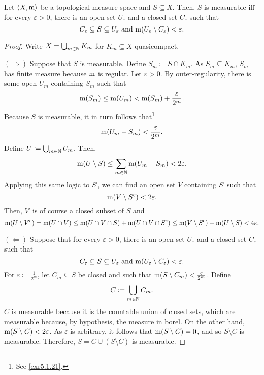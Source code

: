 \begin{prp}\label{prp5.1.39}
Let $\langle X,\mathrm{m}\rangle$ be a topological measure space and $S\subseteq X$.  Then, $S$ is measurable iff for every $\varepsilon >0$, there is an open set $U_{\varepsilon}$ and a closed set $C_{\varepsilon}$ such that
\begin{equation}
C_{\varepsilon}\subseteq S\subseteq U_{\varepsilon}\text{ and }\mathrm{m} (U_{\varepsilon}\setminus C_{\varepsilon})<\varepsilon .
\end{equation}
\begin{proof}
Write $X=\bigcup _{m\in \mathbb{N}}K_m$ for $K_m\subseteq X$ quasicompact.

\blankline
\noindent
$(\Rightarrow )$  Suppose that $S$ is measurable.  Define $S_m\coloneqq S\cap K_m$.  As $S_m\subseteq K_m$, $S_m$ has finite measure because $\mathrm{m}$ is regular.  Let $\varepsilon >0$.  By outer-regularity, there is some open $U_m$ containing $S_m$ such that
\begin{equation}
\mathrm{m} (S_m)\leq \mathrm{m} (U_m)<\mathrm{m} (S_m)+\frac{\varepsilon}{2^m}.
\end{equation}
Because $S$ is measurable, it in turn follows that\footnote{See \cref{exr5.1.21}.}
\begin{equation}
\mathrm{m} (U_m-S_m)<\frac{\varepsilon}{2^m}.
\end{equation}
Define $U\coloneqq \bigcup _{m\in \mathbb{N}}U_m$.  Then,
\begin{equation}
\mathrm{m} (U\setminus S)\leq \sum _{m\in \mathbb{N}}\mathrm{m} (U_m-S_m)<2\varepsilon .
\end{equation}
Applying this same logic to $S^{\comp}$, we can find an open set $V$ containing $S^{\comp}$ such that
\begin{equation}
\mathrm{m} (V\setminus S^{\mathsf{c} })<2\varepsilon .
\end{equation}
Then, $V^{\comp}$ is of course a closed subset of $S$ and
\begin{equation}
\mathrm{m} (U\setminus V^{\mathsf{c}})=\mathrm{m} (U\cap V)\leq \mathrm{m} (U\cap V\cap S)+\mathrm{m} (U\cap V\cap S^{\mathsf{c}})\leq \mathrm{m} (V\setminus S^{\mathsf{c}})+\mathrm{m} (U\setminus S)<4\varepsilon .
\end{equation}

\blankline
\noindent
$(\Leftarrow )$ Suppose that for every $\varepsilon >0$, there is an open set $U_{\varepsilon}$ and a closed set $C_{\varepsilon}$ such that
\begin{equation}
C_{\varepsilon}\subseteq S\subseteq U_{\varepsilon}\text{ and }\mathrm{m} (U_{\varepsilon}\setminus C_{\varepsilon})<\varepsilon .
\end{equation}
For $\varepsilon \coloneqq \frac{1}{2^m}$, let $C_m\subseteq S$ be closed and such that $\mathrm{m} (S\setminus C_m)<\frac{\varepsilon}{2^m}$.  Define
\begin{equation}
C\coloneqq \bigcup _{m\in \mathbb{N}}C_m.
\end{equation}
$C$ is measurable because it is the countable union of closed sets, which are measurable because, by hypothesis, the measure in borel.  On the other hand, $\mathrm{m} (S\setminus C)<2\varepsilon$.  As $\varepsilon$ is arbitrary, it follows that $\mathrm{m} (S\setminus C)=0$, and so $S\setminus C$ is measurable.  Therefore, $S=C\cup (S\setminus C)$ is measurable.
\end{proof}
\end{prp}
